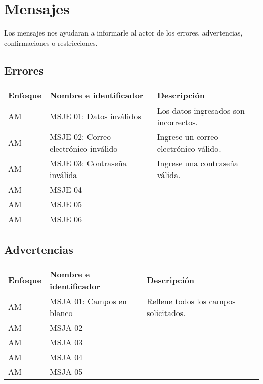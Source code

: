 \section{Mensajes}
Los mensajes nos ayudaran a informarle al actor de los errores, advertencias, confirmaciones o restricciones.
\subsection{Errores}
  \begin{center}
   \begin{tabular}{|p{1.5cm}|p{4cm}|p{7cm}|}
     \hline
       \textbf{Enfoque}&\textbf{Nombre e identificador} & \textbf{Descripción} \\ \hline
           \label{msje_01} AM & MSJE 01: Datos inválidos & Los datos ingresados son incorrectos. \\ \hline
           \label{msje_02} AM & MSJE 02: Correo electrónico inválido & Ingrese un correo electrónico válido. \\ \hline
           \label{msje_03} AM & MSJE 03: Contraseña inválida & Ingrese una contraseña válida. \\ \hline
           \label{msje_} AM & MSJE 04 & \\ \hline
           \label{msje_} AM & MSJE 05 & \\ \hline
           \label{msje_} AM & MSJE 06 & \\ \hline
   \end{tabular}
    \label{tab:msje}
 \end{center}  

\subsection{Advertencias}
  \begin{center}
   \begin{tabular}{|p{1.5cm}|p{4cm}|p{7cm}|}
     \hline
       \textbf{Enfoque}&\textbf{Nombre e identificador} & \textbf{Descripción} \\ \hline
       	\label{msja_01} AM & MSJA 01: Campos en blanco & Rellene todos los campos solicitados.\\ \hline
       	\label{msja_} AM & MSJA 02 & \\ \hline
       	\label{msja_} AM & MSJA 03 & \\ \hline
       	\label{msja_} AM & MSJA 04 & \\ \hline
       	\label{msja_} AM & MSJA 05 & \\ \hline
   \end{tabular}
    \label{tab:msja}
 \end{center}  
 
